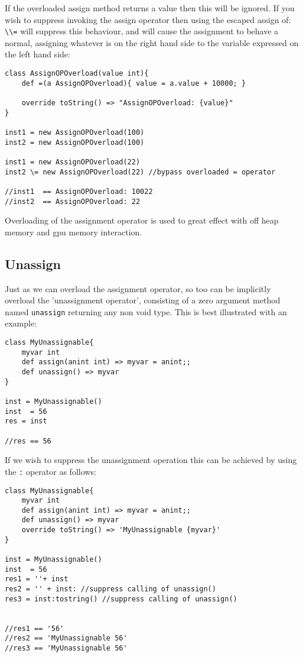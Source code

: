 \documentclass[conc-doc]{subfiles}
\begin{document}
If the overloaded assign method returns a value then this will be ignored. If you wish to suppress invoking the assign operator then using the escaped assign of: \lstinline{\\=} will suppress this behaviour, and will cause the assignment to behave a normal, assigning whatever is on the right hand side to the variable expressed on the left hand side:
\begin{lstlisting}
class AssignOPOverload(value int){	
	def =(a AssignOPOverload){ value = a.value + 10000; }
	
	override toString() => "AssignOPOverload: {value}"
}

inst1 = new AssignOPOverload(100)
inst2 = new AssignOPOverload(100)

inst1 = new AssignOPOverload(22)
inst2 \= new AssignOPOverload(22) //bypass overloaded = operator

//inst1  == AssignOPOverload: 10022
//inst2  == AssignOPOverload: 22
\end{lstlisting}

Overloading of the assignment operator is used to great effect with off heap memory and gpu memory interaction.

\subsection{Unassign}
Just as we can overload the assignment operator, so too can be implicitly overload the 'unassignment operator', consisting of a zero argument method named \lstinline{unassign} returning any non void type. This is best illustrated with an example:
\begin{lstlisting}
class MyUnassignable{
	myvar int
	def assign(anint int) => myvar = anint;;
	def unassign() => myvar
}

inst = MyUnassignable()
inst  = 56
res = inst 

//res == 56
\end{lstlisting}

If we wish to suppress the unassignment operation this can be achieved by using the \lstinline{:} operator as follows:

\begin{lstlisting}
class MyUnassignable{
	myvar int
	def assign(anint int) => myvar = anint;;
	def unassign() => myvar
	override toString() => 'MyUnassignable {myvar}'
}

inst = MyUnassignable()
inst  = 56
res1 = ''+ inst 
res2 = '' + inst: //suppress calling of unassign()
res3 = inst:tostring() //suppress calling of unassign()


//res1 == '56'
//res2 == 'MyUnassignable 56'
//res3 == 'MyUnassignable 56'
\end{lstlisting}
\end{document}
